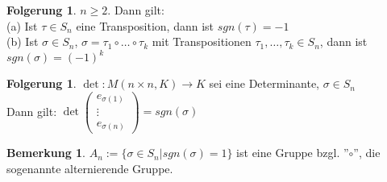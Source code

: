 \documentclass[10pt,a4paper,numbers=endperiod]{scrartcl}
\theoremstyle{definition}
\newtheorem{bem}[satz]{Bemerkung}
\newtheorem{folg}[satz]{Folgerung}
\begin{document}
\begin{folg}
	$n \geq 2$. Dann gilt:\\
	(a) Ist $\tau  \in S_n$ eine Transposition, dann ist $sgn(\tau) = -1$\\
	(b) Ist $\sigma \in S_n$, $ \sigma = \tau_1 \circ \ldots \circ \tau_k$ mit Transpositionen $\tau_1, \ldots ,\tau_k \in S_n$, dann ist $sgn(\sigma)= (-1)^{k}$ 
\end{folg}

\begin{folg}
	$\det: M(n \times n,K) \rightarrow K$ sei eine Determinante, $\sigma \in S_n$\\
	Dann gilt: $\det \begin{pmatrix}
	e_{\sigma(1)}\\
	\vdots\\
	e_{\sigma(n)} 
	\end{pmatrix}= sgn(\sigma)$
\end{folg}

\begin{bem}
	$A_n := \{ \sigma \in S_n | sgn(\sigma) = 1\}$ ist eine Gruppe bzgl. ''$\circ$'', die sogenannte alternierende Gruppe.
\end{bem}
\end{document}
